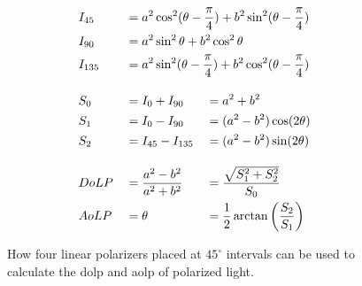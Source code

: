 \begin{figure}[H]
\begin{minipage}{.48\textwidth}
\begin{alignat}{3}
             & I_{45}                                                                         & 
             & = \mathrlap{a^2\cos^2(\theta-\frac{\pi}{4}) + b^2\sin^2(\theta-\frac{\pi}{4})} & 
             &                                                                                   \\
             & I_{90}                                                                         & 
             & = \mathrlap{a^2\sin^2\theta + b^2\cos^2\theta                                } & 
             &                                                                                   \\
             & I_{135}                                                                        & 
             & = \mathrlap{a^2\sin^2(\theta-\frac{\pi}{4}) + b^2\cos^2(\theta-\frac{\pi}{4})} & 
             &                                                                                   \\[1em]
             & S_0                                                                            & 
             & = I_0 + I_{90}                                                                 & 
             & = a^2+b^2                                                                         \\
             & S_1                                                                            & 
             & = I_0 - I_{90}                                                                 & 
             & =(a^2-b^2)\cos(2\theta)                                                                \\
             & S_2                                                                            & 
             & = I_{45} - I_{135}                                                             & 
             & =(a^2-b^2)\sin(2\theta)                                                                \\[1em]
             & DoLP                                                                           & 
             & =\frac{a^2-b^2}{a^2+b^2}                                                       & 
             & = \frac{\sqrt{S_1^2 + S_2^2}}{S_0}                                                \\
             & AoLP                                                                           & 
             & =  \theta                                                                      & 
             & = \frac{1}{2}\arctan{\left(\frac{S_2}{S_1}\right)}
        \end{alignat}
    \end{minipage}%
    
    \caption{How four linear polarizers placed at $45^\circ$ intervals can be used to calculate the \gls{dolp} and \gls{aolp} of polarized light. \label{fig:polarization_calculation}}
\end{figure}%

